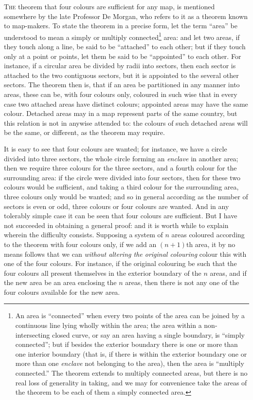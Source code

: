 \documentclass[12pt,a4paper,oneside]{book}
\theoremstyle{plain}
\theoremstyle{definition}
\theoremstyle{remark}
\begin{document}
\textsc{The} theorem that four colours are sufficient for any map, is mentioned somewhere by the late Professor De Morgan, who refers to it as a theorem known to map-makers. To state the theorem in a precise form, let the term ``area'' be understood to mean a simply or multiply connected\footnote{An area is ``connected'' when every two points of the area can be joined by a continuous line lying wholly within the area; the area within a non-intersecting closed curve, or say an area having a single boundary, is ``simply connected''; but if besides the exterior boundary there is one or more than one interior boundary (that is, if there is within the exterior boundary one or more than one \textit{enclave} not belonging to the area), then the area is ``multiply connected.'' The theorem extends to multiply connected areas, but there is no real loss of generality in taking, and we may for convenience take the areas of the theorem to be each of them a simply connected area.} area: and let two areas, if they touch along a line, be said to be ``attached'' to each other; but if they touch only at a point or points, let them be said to be ``appointed'' to each other. For instance, if a circular area be divided by radii into sectors, then each sector is attached to the two contiguous sectors, but it is appointed to the several other sectors. The theorem then is, that if an area be partitioned in any manner into areas, these can be, with four colours only, coloured in such wise that in every case two attached areas have distinct colours; appointed areas may have the same colour. Detached areas may in a map represent parts of the same country, but this relation is not in anywise attended to: the colours of such detached areas will be the same, or different, as the theorem may require.

It is easy to see that four colours are wanted; for instance, we have a circle divided into three sectors, the whole circle forming an \textit{enclave} in another area; then we require three colours for the three sectors, and a fourth colour for the surrounding area: if the circle were divided into four sectors, then for these two colours would be sufficient, and taking a third colour for the surrounding area, three colours only would be wanted; and so in general according as the number of sectors is even or odd, three colours or four colours are wanted. And in any tolerably simple case it can be seen that four colours are sufficient. But I have not succeeded in obtaining a general proof: and it is worth while to explain wherein the difficulty consists. Supposing a system of $n$ areas coloured according to the theorem with four colours only, if we add an $(n+1)$th area, it by no means follows that we can \textit{without altering the original colouring} colour this with one of the four colours. For instance, if the original colouring be such that the four colours all present themselves in the exterior boundary of the $n$ areas, and if the new area be an area enclosing the $n$ areas, then there is not any one of the four colours available for the new area.
\end{document}
